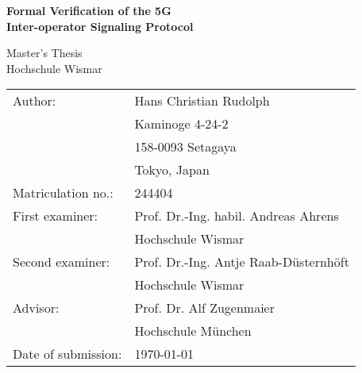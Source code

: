 \begin{titlepage}
\centering

\vspace*{3cm}

{
    \Huge{
        \textbf{Formal Verification of the 5G\\
        \vspace{4mm}
        Inter-operator Signaling Protocol}
    }
}

\vspace{1cm}

\centering

\LARGE
Master's Thesis\\
Hochschule Wismar

\vspace{2cm}

\vfill
{
    \renewcommand{\arraystretch}{1.1}
    {

    \begin{table}[h!]
    \centering
    \large
    \begin{tabular}{ll}
    Author:             & Hans Christian Rudolph               \\
                        & Kaminoge 4-24-2                      \\
                        & 158-0093 Setagaya                    \\
                        & Tokyo, Japan                         \\
        Matriculation no.:  & 244404                           \vspace{3mm}\\
    First examiner:     & Prof. Dr.-Ing. habil. Andreas Ahrens \\
                        & Hochschule Wismar                    \\
    Second examiner:    & Prof. Dr.-Ing. Antje Raab-Düsternhöft\\
                        & Hochschule Wismar                    \\
    Advisor:            & Prof. Dr. Alf Zugenmaier             \\\vspace{3mm}
                        & Hochschule München                   \\
    Date of submission: & \today
    \end{tabular}
    \end{table}
    }
}

\vspace{2cm}

\end{titlepage}

